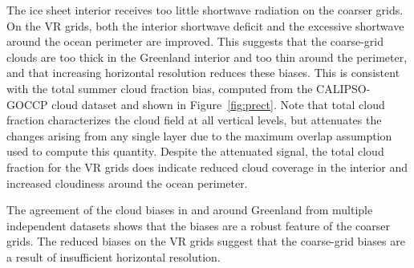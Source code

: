 \documentclass[draft]{agujournal2019}
\begin{document}
The ice sheet interior receives too little shortwave radiation on the coarser grids. On the VR grids, both the interior shortwave deficit and the excessive shortwave around the ocean perimeter are improved. This suggests that the coarse-grid clouds are too thick in the Greenland interior and too thin around the perimeter, and that increasing horizontal resolution reduces these biases. This is consistent with the total summer cloud fraction bias, computed from the CALIPSO-GOCCP cloud dataset  and shown in Figure~\ref{fig:prect}. Note that total cloud fraction characterizes the cloud field at all vertical levels, but attenuates the changes arising from any single layer due to the maximum overlap assumption used to compute this quantity. Despite the attenuated signal, the total cloud fraction for the VR grids does indicate reduced cloud coverage in the interior and increased cloudiness around the ocean perimeter. 

The agreement of the cloud biases in and around Greenland from multiple independent datasets shows that the biases are a robust feature of the coarser grids. The reduced biases on the VR grids suggest that the coarse-grid biases are a result of insufficient horizontal resolution.
\end{document}
